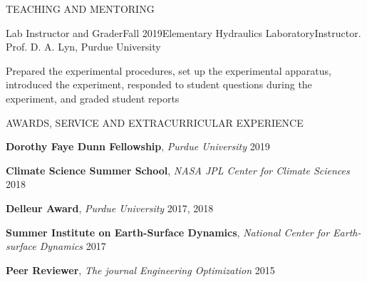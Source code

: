 \documentclass{resume_anzy} %
\begin{document}

\begin{rSection}{TEACHING AND MENTORING}
\begin{rSubsection}{Lab Instructor and Grader}{Fall 2019}{Elementary Hydraulics Laboratory}{Instructor. Prof. D. A. Lyn, Purdue University}
\item  Prepared the experimental procedures, set up the experimental apparatus, introduced the experiment, responded to student questions during the experiment, and graded student reports 
\end{rSubsection}
\end{rSection}

\begin{rSection}{AWARDS, SERVICE AND EXTRACURRICULAR  EXPERIENCE}
\vspace{-2.5mm}
\item \textbf{Dorothy Faye Dunn Fellowship}, \textit{Purdue University} \hfill{2019}
\item \textbf{Climate Science Summer School}, \textit{NASA JPL Center for Climate Sciences} \hfill{2018}
\item \textbf{Delleur Award}, \textit{Purdue University} \hfill{2017, 2018}
\item \textbf{Summer Institute on Earth-Surface Dynamics}, \textit{National Center for Earth-surface Dynamics} \hfill{2017}
\item \textbf{Peer Reviewer}, \textit{The journal Engineering Optimization} \hfill{2015}
\end{rSection}



\end{document}

